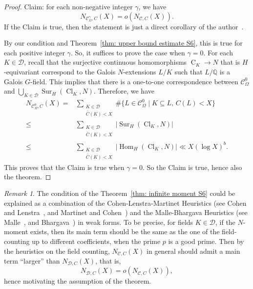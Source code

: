 \documentclass[12pt,a4paper]{amsart}
\numberwithin{equation}{section}%
\theoremstyle{plain}%
\theoremstyle{definition}%
\theoremstyle{remark}%
\newtheorem*{remark}{Remark}%
\begin{document}
    \begin{proof}
    	Claim: for each non-negative integer $\gamma$, we have
    	\begin{equation*}
    		N_{\mathcal{C}_{\Omega}^{\gamma},C}(X)=o(N_{\mathcal{C},C}(X)).
    	\end{equation*}
    	If the Claim is true, then the statement is just a direct corollary of the author~\cite[Theorem 3.14]{wang2026invariant}.
    	
    	By our condition and Theorem~\ref{thm: upper bound estimate S6}, this is true for each positive integer $\gamma$.
    	So, it suffices to prove the case when $\gamma=0$.
    	For each $K\in\mathcal{D}$, recall that the surjective continuous homomorphisms $\operatorname{C}_{K}\to N$ that is $H$-equivariant correspond to the Galois $N$-extensions $L/K$ such that $L/\mathbb{Q}$ is a Galois $G$-field.
    	This implies that there is a one-to-one correspondence between $\mathcal{C}_{\Omega}^{0}$ and $\bigcup_{K\in\mathcal{D}}\operatorname{Sur}_{H}(\operatorname{Cl}_{K},N)$.
    	Therefore, we have
    	\begin{align*}
    		N_{\mathcal{C}_{\Omega}^{0},C}(X)
    		=& \sum_{
    			\substack{
    				K\in\mathcal{D} \\
    				\bar{C}(K)<X
    			}
    		}\#\{L\in\mathcal{C}_{\Omega}^{0}\mid K\subseteq L,\, C(L)<X\} \\
    		\leq & \sum_{
    			\substack{
    				K\in\mathcal{D} \\
    				\bar{C}(K)<X
    			}
    		}\lvert\operatorname{Sur}_{H}(\operatorname{Cl}_{K},N)\rvert \\
    		\leq & \sum_{
    			\substack{
    				K\in\mathcal{D} \\
    				\bar{C}(K)<X
    			}
    		} \lvert\operatorname{Hom}_{H}(\operatorname{Cl}_{K},N)\rvert\ll X(\log X)^{b}.
    	\end{align*}
    	This proves that the Claim is true when $\gamma=0$.
    	So the Claim is true, hence also the theorem.
    \end{proof}
    \begin{remark}
    	The condition of the Theorem~\ref{thm: infinite moment S6} could be explained as a combination of the Cohen-Lenstra-Martinet Heuristics (see Cohen and Lenstra~\cite{cohen1984heuristics}, and Martinet and Cohen~\cite{martinet1990etude}) and the Malle-Bhargava Heuristics (see Malle~\cite{malle2004distribution}, and Bhargava~\cite{bhargava07mass}) in weak forms.
    	To be precise, for fields $K\in\mathcal{D}$, if the $N$-moment exists, then its main term should be the same as the one of the field-counting up to different coefficients, when the prime $p$ is a good prime.
    	Then by the heuristics on the field counting, $N_{\mathcal{C},C}(X)$ in general should admit a main term ``larger'' than $N_{\mathcal{D},C}(X)$, that is,
    	\begin{equation*}
    		N_{\mathcal{D},C}(X)=o(N_{\mathcal{C},C}(X)),
    	\end{equation*} 
    	hence motivating the assumption of the theorem.
    \end{remark}
\end{document}
